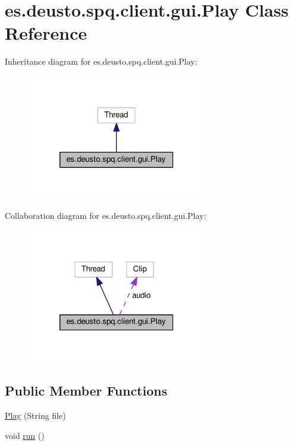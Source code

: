 \hypertarget{classes_1_1deusto_1_1spq_1_1client_1_1gui_1_1_play}{}\section{es.\+deusto.\+spq.\+client.\+gui.\+Play Class Reference}
\label{classes_1_1deusto_1_1spq_1_1client_1_1gui_1_1_play}


Inheritance diagram for es.\+deusto.\+spq.\+client.\+gui.\+Play\+:\nopagebreak
\begin{figure}[H]
\begin{center}
\leavevmode
\includegraphics[width=223pt]{classes_1_1deusto_1_1spq_1_1client_1_1gui_1_1_play__inherit__graph}
\end{center}
\end{figure}


Collaboration diagram for es.\+deusto.\+spq.\+client.\+gui.\+Play\+:\nopagebreak
\begin{figure}[H]
\begin{center}
\leavevmode
\includegraphics[width=223pt]{classes_1_1deusto_1_1spq_1_1client_1_1gui_1_1_play__coll__graph}
\end{center}
\end{figure}
\subsection*{Public Member Functions}
\begin{DoxyCompactItemize}
\item 
\hyperlink{classes_1_1deusto_1_1spq_1_1client_1_1gui_1_1_play_a6caae4a347d768940a65a179d767289f}{Play} (String file)
\item 
void \hyperlink{classes_1_1deusto_1_1spq_1_1client_1_1gui_1_1_play_a3f0602abbd8078524b7e10aa11e2be42}{run} ()
\end{DoxyCompactItemize}
